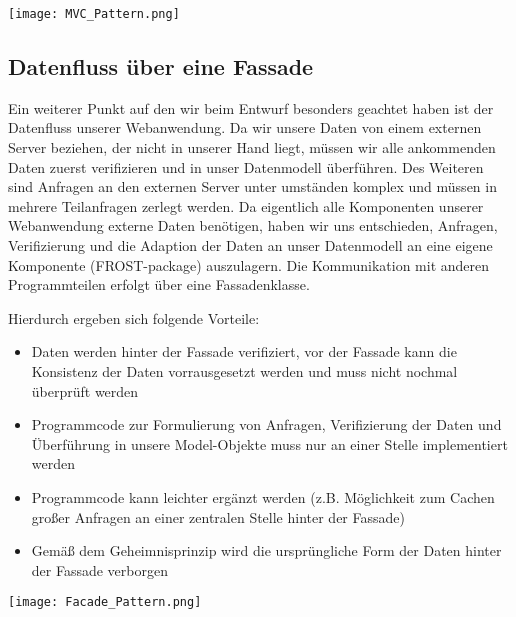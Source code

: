 \vspace{5mm}

\texttt{[image: MVC\_Pattern.png]}

\newpage

\subsection{Datenfluss über eine Fassade}
Ein weiterer Punkt auf den wir beim Entwurf besonders geachtet haben ist der Datenfluss unserer Webanwendung. 
Da wir unsere Daten von einem externen Server beziehen, der nicht in unserer Hand liegt, müssen wir alle ankommenden Daten zuerst verifizieren und in unser Datenmodell überführen. 
Des Weiteren sind Anfragen an den externen Server unter umständen komplex und müssen in mehrere Teilanfragen zerlegt werden.
Da eigentlich alle Komponenten unserer Webanwendung externe Daten benötigen, haben wir uns entschieden, Anfragen, Verifizierung und die Adaption der Daten an unser Datenmodell an eine eigene Komponente (FROST-package) auszulagern. 
Die Kommunikation mit anderen Programmteilen erfolgt über eine Fassadenklasse.

Hierdurch ergeben sich folgende Vorteile:
\begin{itemize}
    \item Daten werden hinter der Fassade verifiziert, vor der Fassade kann die Konsistenz der Daten vorrausgesetzt 
    werden und muss nicht nochmal überprüft werden
    \item Programmcode zur Formulierung von Anfragen, Verifizierung der Daten und Überführung in 
    unsere Model-Objekte muss nur an einer Stelle implementiert werden
    \item Programmcode kann leichter ergänzt werden (z.B. Möglichkeit zum Cachen großer Anfragen an 
    einer zentralen Stelle hinter der Fassade)
    \item Gemäß dem Geheimnisprinzip wird die ursprüngliche Form der Daten hinter 
    der Fassade verborgen
\end{itemize}

\vspace{5mm}

\texttt{[image: Facade\_Pattern.png]}
